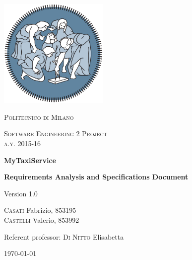 



%
%    

\begin{titlepage}
	\centering
	\includegraphics[width=150pt]{polimi_logo}\par\vspace{1cm}
	{\scshape\LARGE
		Politecnico di Milano\par}
	\vspace{1cm}
	{\scshape\Large
		Software Engineering 2 Project\\
		a.y. 2015-16\par}
	\vspace{1.5cm}
	{\huge\bfseries
		MyTaxiService\\\par}
	{\Large\bfseries
		Requirements Analysis and Specifications Document\par}
	Version 1.0\par
	\vspace{2cm}
	{\Large
		{\scshape Casati} Fabrizio, 853195\\
		{\scshape Castelli} Valerio, 853992\par}
	\vfill
	Referent professor: {\scshape Di Nitto} Elisabetta\par

	\vfill

	{\large\today\par}
\end{titlepage}

